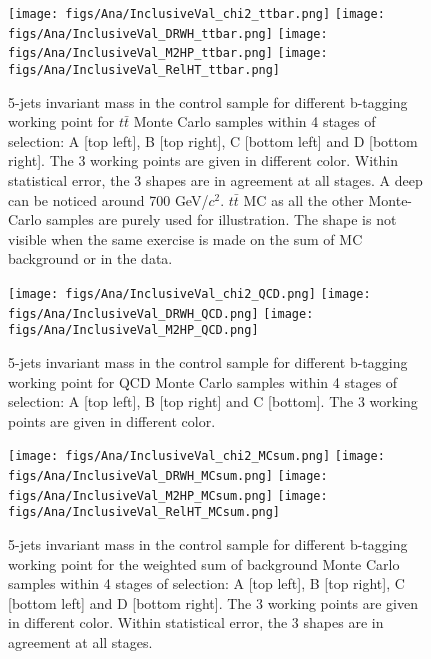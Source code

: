 \begin{figure}[!Hhtbp]
  \begin{center}
    \texttt{[image: figs/Ana/InclusiveVal\_chi2\_ttbar.png]}
    \texttt{[image: figs/Ana/InclusiveVal\_DRWH\_ttbar.png]}
    \texttt{[image: figs/Ana/InclusiveVal\_M2HP\_ttbar.png]}
    \texttt{[image: figs/Ana/InclusiveVal\_RelHT\_ttbar.png]}
    \caption{5-jets invariant mass in the control sample for different b-tagging working point for $t\bar{t}$ Monte Carlo samples within 4 stages of selection: A [top left], B [top right], C [bottom left] and D [bottom right]. The 3 working points are given in different color. Within statistical error, the 3 shapes are in agreement at all stages. A deep can be noticed around 700 GeV/$c^{2}$. $t\bar{t}$ MC as all the other Monte-Carlo samples are purely used for illustration. The shape is not visible when the same exercise is made on the sum of MC background or in the data.}
    \label{fig:StageWPttbar}
  \end{center}
\end{figure}

\begin{figure}[!Hhtbp]
  \begin{center}
    \texttt{[image: figs/Ana/InclusiveVal\_chi2\_QCD.png]}
    \texttt{[image: figs/Ana/InclusiveVal\_DRWH\_QCD.png]}
    \texttt{[image: figs/Ana/InclusiveVal\_M2HP\_QCD.png]}
    \caption{5-jets invariant mass in the control sample for different b-tagging working point for QCD Monte Carlo samples within 4 stages of selection: A [top left], B [top right] and C [bottom]. The 3 working points are given in different color.}
    \label{fig:StageWPQCD}
  \end{center}
\end{figure}

\begin{figure}[!Hhtbp]
  \begin{center}
    \texttt{[image: figs/Ana/InclusiveVal\_chi2\_MCsum.png]}
    \texttt{[image: figs/Ana/InclusiveVal\_DRWH\_MCsum.png]}
    \texttt{[image: figs/Ana/InclusiveVal\_M2HP\_MCsum.png]}
    \texttt{[image: figs/Ana/InclusiveVal\_RelHT\_MCsum.png]}
    \caption{5-jets invariant mass in the control sample for different b-tagging working point for the weighted sum of background Monte Carlo samples within 4 stages of selection: A [top left], B [top right], C [bottom left] and D [bottom right]. The 3 working points are given in different color. Within statistical error, the 3 shapes are in agreement at all stages.}
    \label{fig:StageWPSum}
  \end{center}
\end{figure}

